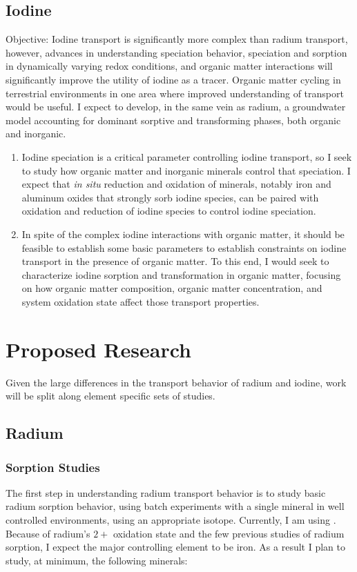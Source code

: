 \documentclass[twoside,12pt,titlepage]{article}
\newcommand{\isotope}[2]{\ch{^{#1}#2}}
\begin{document}
\subsection{Iodine}

Objective: Iodine transport is significantly more complex than radium transport, however, advances in understanding speciation behavior, speciation and sorption in dynamically varying redox conditions, and organic matter interactions will significantly improve the utility of iodine as a tracer. Organic matter cycling in terrestrial environments in one area where improved understanding of transport would be useful. I expect to develop, in the same vein as radium, a groundwater model accounting for dominant sorptive and transforming phases, both organic and inorganic.

\begin{enumerate}[label = \arabic*)]
	\item Iodine speciation is a critical parameter controlling iodine transport, so I seek to study how organic matter and inorganic minerals control that speciation. I expect that \textit{in situ} reduction and oxidation of minerals, notably iron and aluminum oxides that strongly sorb iodine species, can be paired with oxidation and reduction of iodine species to control iodine speciation.
	\item In spite of the complex iodine interactions with organic matter, it should be feasible to establish some basic parameters to establish constraints on iodine transport in the presence of organic matter. To this end, I would seek to characterize iodine sorption and transformation in organic matter, focusing on how organic matter composition, organic matter concentration, and system oxidation state affect those transport properties.

\end{enumerate}

\section{Proposed Research}

Given the large differences in the transport behavior of radium and iodine, work will be split along element specific sets of studies.

\subsection{Radium}

\subsubsection{Sorption Studies}
The first step in understanding radium transport behavior is to study basic radium sorption behavior, using batch experiments with a single mineral in well controlled environments, using an appropriate isotope. Currently, I am using \isotope{226}{Ra}. Because of radium's $2+$ oxidation state and the few previous studies of radium sorption, I expect the major controlling element to be iron. As a result I plan to study, at minimum, the following minerals:
\end{document}
